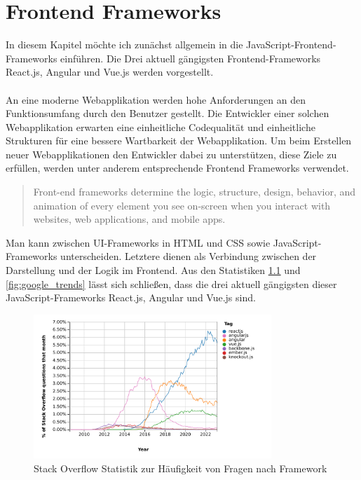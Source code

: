 %

\chapter{Frontend Frameworks}

In diesem Kapitel möchte ich zunächst allgemein in die JavaScript-Frontend-Frameworks einführen.
Die Drei aktuell gängigsten Frontend-Frameworks React.js, Angular und Vue.js werden vorgestellt.
\\
\\
An eine moderne Webapplikation werden hohe Anforderungen an den Funktionsumfang durch den Benutzer gestellt.
Die Entwickler einer solchen Webapplikation erwarten eine einheitliche Codequalität und einheitliche Strukturen
für eine bessere Wartbarkeit der Webapplikation.
Um beim Erstellen neuer Webapplikationen den Entwickler dabei zu unterstützen, diese Ziele zu erfüllen,
werden unter anderem entsprechende Frontend Frameworks verwendet.
\begin{quote}
    Front-end frameworks determine the logic, structure, design, behavior,
    and animation of every element you see on-screen when you interact with websites,
    web applications, and mobile apps. \cite{sigdestad22}
\end{quote}
Man kann zwischen UI-Frameworks in HTML und CSS sowie JavaScript-Frameworks unterscheiden.
Letztere dienen als Verbindung zwischen der Darstellung und der Logik im Frontend.
Aus den Statistiken \ref{fig:stackoverflow_stat} und \ref{fig:google_trends} lässt sich schließen,
dass die drei aktuell gängigsten dieser JavaScript-Frameworks React.js, Angular und Vue.js sind.



\begin{figure}[!htb]
    \centering
    \includegraphics[width=0.8\textwidth]{img/js_frameworks_statistic_stackoverflow}
    \caption{Stack Overflow Statistik zur Häufigkeit von Fragen nach Framework \cite{stackoverflowStats}}
    \label{fig:stackoverflow_stat}
\end{figure}

